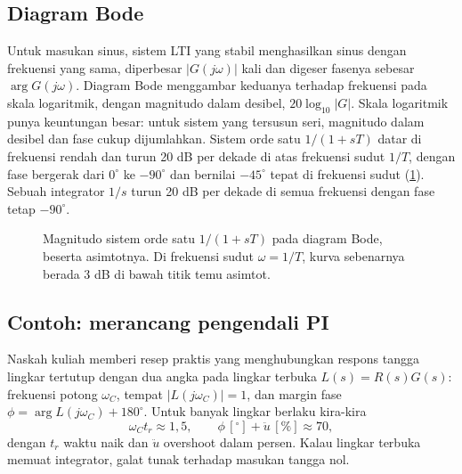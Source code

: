 \subsection{Diagram Bode}

Untuk masukan sinus, sistem LTI yang stabil menghasilkan sinus dengan frekuensi yang sama, diperbesar $|G(j\omega)|$ kali dan
digeser fasenya sebesar $\arg G(j\omega)$. Diagram Bode menggambar keduanya terhadap frekuensi pada skala logaritmik, dengan
magnitudo dalam desibel, $20\log_{10}|G|$. Skala logaritmik punya keuntungan besar: untuk sistem yang tersusun seri, magnitudo dalam
desibel dan fase cukup dijumlahkan. Sistem orde satu $1/(1+sT)$ datar di frekuensi rendah dan turun 20 dB per dekade di atas
frekuensi sudut $1/T$, dengan fase bergerak dari $0^\circ$ ke $-90^\circ$ dan bernilai $-45^\circ$ tepat di frekuensi sudut
(\cref{fig:bode}). Sebuah integrator $1/s$ turun 20 dB per dekade di semua frekuensi dengan fase tetap $-90^\circ$.

\begin{figure}[ht]
\centering
{}
\caption{Magnitudo sistem orde satu $1/(1+sT)$ pada diagram Bode, beserta asimtotnya. Di frekuensi sudut $\omega=1/T$, kurva sebenarnya
berada 3 dB di bawah titik temu asimtot.}
\label{fig:bode}
\end{figure}

\subsection{Contoh: merancang pengendali PI}

Naskah kuliah memberi resep praktis yang menghubungkan respons tangga lingkar tertutup dengan dua angka pada lingkar terbuka
$L(s)=R(s)G(s)$: frekuensi potong $\omega_C$, tempat $|L(j\omega_C)|=1$, dan margin fase $\phi=\arg L(j\omega_C)+180^\circ$. Untuk
banyak lingkar berlaku kira-kira
\begin{equation}
\omega_Ct_r\approx1{,}5,\qquad \phi\,[^\circ]+\ddot u\,[\%]\approx70,
\end{equation}
dengan $t_r$ waktu naik dan $\ddot u$ overshoot dalam persen. Kalau lingkar terbuka memuat integrator, galat tunak terhadap masukan
tangga nol.

